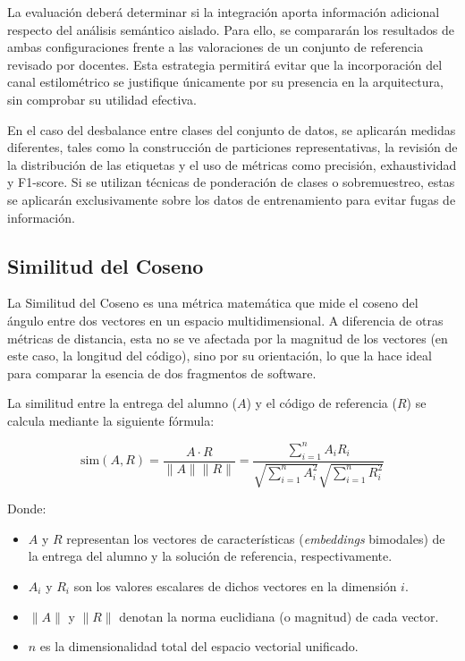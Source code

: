La evaluación deberá determinar si la integración aporta información adicional respecto del análisis semántico aislado. Para ello, se compararán los resultados de ambas configuraciones frente a las valoraciones de un conjunto de referencia revisado por docentes. Esta estrategia permitirá evitar que la incorporación del canal estilométrico se justifique únicamente por su presencia en la arquitectura, sin comprobar su utilidad efectiva.

En el caso del desbalance entre clases del conjunto de datos, se aplicarán medidas diferentes, tales como la construcción de particiones representativas, la revisión de la distribución de las etiquetas y el uso de métricas como precisión, exhaustividad y F1-score. Si se utilizan técnicas de ponderación de clases o sobremuestreo, estas se aplicarán exclusivamente sobre los datos de entrenamiento para evitar fugas de información.

\subsection{Similitud del Coseno}

La Similitud del Coseno es una métrica matemática que mide el coseno del ángulo entre dos vectores en un espacio multidimensional. A diferencia de otras métricas de distancia, esta no se ve afectada por la magnitud de los vectores (en este caso, la longitud del código), sino por su orientación, lo que la hace ideal para comparar la esencia de dos fragmentos de software.

La similitud entre la entrega del alumno ($A$) y el código de referencia ($R$) se calcula mediante la siguiente fórmula:

\begin{equation}
	\text{sim}(A, R) = \frac{A \cdot R}{\|A\| \|R\|} = \frac{\sum_{i=1}^{n} A_i R_i}{\sqrt{\sum_{i=1}^{n} A_i^2} \sqrt{\sum_{i=1}^{n} R_i^2}}
	\label{eq:coseno}
\end{equation}

Donde:
\begin{itemize}
    \item $A$ y $R$ representan los vectores de características (\textit{embeddings} bimodales) de la entrega del alumno y la solución de referencia, respectivamente.
    \item $A_i$ y $R_i$ son los valores escalares de dichos vectores en la dimensión $i$.
    \item $\|A\|$ y $\|R\|$ denotan la norma euclidiana (o magnitud) de cada vector.
    \item $n$ es la dimensionalidad total del espacio vectorial unificado.
\end{itemize}

